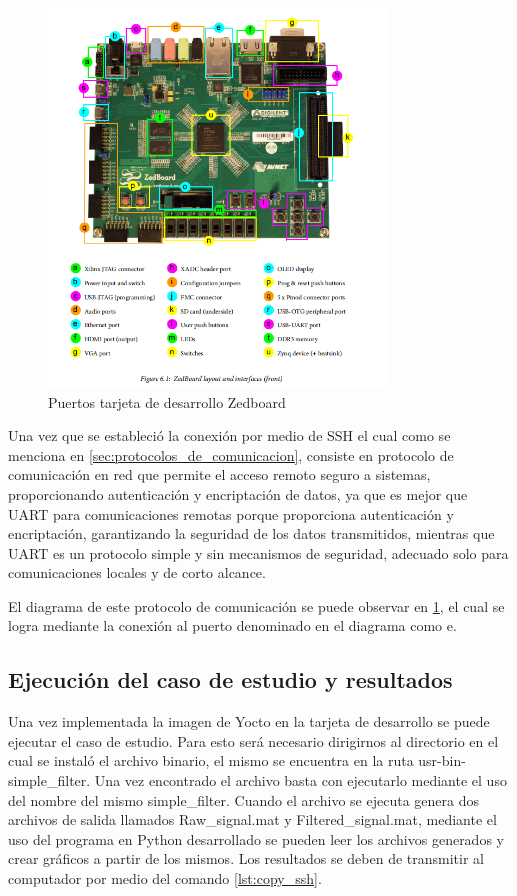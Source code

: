 \begin{figure}[h!]
    \centering
    \includegraphics[width=0.8\textwidth]{fig/especifico_2/154140ZedBoard.png}
    \caption{Puertos tarjeta de desarrollo Zedboard}
    \label{fig:puertos_zedboard}
\end{figure}


Una vez que se estableció la conexión por medio de SSH el cual como se menciona en \ref{sec:protocolos_de_comunicacion}, consiste en protocolo de comunicación en red que permite el acceso remoto seguro a sistemas, proporcionando autenticación y encriptación de datos, ya que es mejor que UART para comunicaciones remotas porque proporciona autenticación y encriptación, garantizando la seguridad de los datos transmitidos, mientras que UART es un protocolo simple y sin mecanismos de seguridad, adecuado solo para comunicaciones locales y de corto alcance. 

El diagrama de este protocolo de comunicación se puede observar en \ref{fig:puertos_zedboard}, el cual se logra mediante la conexión al puerto denominado en el diagrama como e.


\subsection{Ejecución del caso de estudio y resultados}

Una vez implementada la imagen de Yocto en la tarjeta de desarrollo se puede ejecutar el caso de estudio. Para esto será necesario dirigirnos al directorio en el cual se instaló el archivo binario, el mismo se encuentra en la ruta usr-bin-simple\_filter. Una vez encontrado el archivo basta con ejecutarlo mediante el uso del nombre del mismo simple\_filter. Cuando el archivo se ejecuta genera dos archivos de salida llamados Raw\_signal.mat y Filtered\_signal.mat, mediante el uso del programa en Python desarrollado se pueden leer los archivos generados y crear gráficos a partir de los mismos. Los resultados se deben de transmitir al computador por medio del comando \ref{lst:copy_ssh}.

